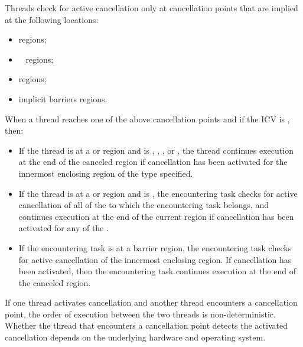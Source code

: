 Threads check for active cancellation only at cancellation points that are
implied at the following locations:

\begin{itemize}
\item {} regions;
\item {}~ regions;
\item {} regions;
\item implicit barriers regions.
\end{itemize}

When a thread reaches one of the above cancellation points and if the 
 ICV is ,  then: 

\begin{itemize}
\item If the thread is at a  or  region
      and  is , , , 
      or , the thread continues execution at the end of the canceled
      region if cancellation has been activated for the innermost enclosing region
      of the type specified.
\item If the thread is at a  or  region
      and  is , the encountering task
      checks for active cancellation of all of the  to which
      the encountering task belongs, and continues execution at the end of the
      current  region if cancellation has been activated for any of 
      the .
\item If the encountering task is at a barrier region, the encountering task
      checks for active cancellation of the innermost enclosing 
      region. If cancellation has been activated, then the encountering task
      continues execution at the end of the canceled region.
\end{itemize}

\begin{note}
If one thread activates cancellation and another thread encounters a cancellation
point, the order of execution between the two threads is non-deterministic.
Whether the thread that encounters a cancellation point detects the activated 
cancellation depends on the underlying hardware and operating system.
\end{note}

